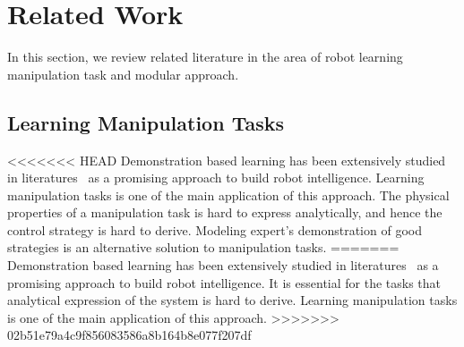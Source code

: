 \section{Related Work}
\label{sec:related}
In this section, we review related literature in the area of robot learning manipulation task and modular approach.



\subsection{Learning Manipulation Tasks}
<<<<<<< HEAD
Demonstration based learning has been extensively studied in literatures~\cite{calinon2007learning,dillmann2004teaching,kulic2012incremental} as a promising approach to build robot intelligence. %
Learning manipulation tasks is one of the main application of this approach. The physical properties of a manipulation task is hard to express analytically, and hence the control strategy is hard to derive. Modeling expert's demonstration of good strategies is an alternative solution to manipulation tasks.
=======
Demonstration based learning has been extensively studied in literatures~\cite{calinon2007learning,dillmann2004teaching,kulic2012incremental} as a promising approach to build robot intelligence. It is essential for the tasks that analytical expression of the system is hard to derive.
Learning manipulation tasks is one of the main application of this approach.
>>>>>>> 02b51e79a4c9f856083586a8b164b8e077f207df

